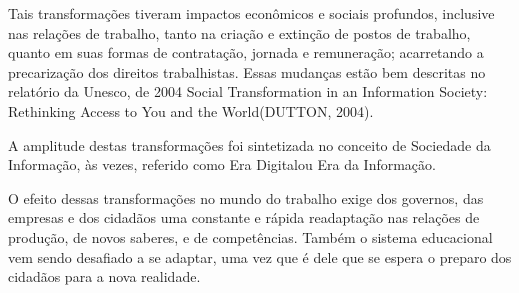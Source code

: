 \documentclass[
12pt,		%
openright,	%
twoside,  %
a4paper,			%
chapter=TITLE,		%
english,			%
french,				%
spanish,			%
brazil				%
]{USPSC-classe/USPSC}
\begin{document}
Tais transforma\c{c}\~oes tiveram impactos econ\^omicos e sociais profundos, inclusive nas rela\c{c}\~oes de trabalho, tanto na cria\c{c}\~ao e extin\c{c}\~ao de postos de trabalho, quanto em suas formas de contrata\c{c}\~ao, jornada e remunera\c{c}\~ao; acarretando a precariza\c{c}\~ao dos direitos trabalhistas. Essas mudan\c{c}as est\~ao bem descritas  no relat\'orio da Unesco,  de 2004 \textquotedbl Social Transformation in an Information Society: Rethinking Access to You and the World\textquotedbl  (DUTTON, 2004).

















A amplitude destas transforma\c{c}\~oes foi sintetizada no conceito de \textquotedbl Sociedade da Informa\c{c}\~ao\textquotedbl , \`as vezes, referido como \textquotedbl Era Digital\textquotedbl  ou \textquotedbl Era da Informa\c{c}\~ao\textquotedbl .

















O efeito dessas transforma\c{c}\~oes no mundo do trabalho exige dos governos, das empresas e dos cidad\~aos uma constante e r\'apida readapta\c{c}\~ao  nas rela\c{c}\~oes de produ\c{c}\~ao, de novos saberes, e de  compet\^encias. Tamb\'em o sistema educacional vem sendo desafiado a se adaptar, uma vez que \'e dele que se espera o preparo dos cidad\~aos para a nova realidade.
\end{document}
